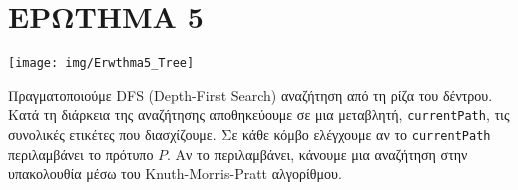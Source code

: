 \chapter{ΕΡΩΤΗΜΑ 5}
    \vspace{-10pt}
    \begin{center} \noindent
        \texttt{[image: img/Erwthma5\_Tree]}
    \end{center}

    Πραγματοποιούμε DFS (Depth-First Search) αναζήτηση από τη ρίζα του δέντρου.
    Κατά τη διάρκεια της αναζήτησης αποθηκεύουμε σε μια μεταβλητή, \texttt{currentPath}, τις συνολικές ετικέτες που διασχίζουμε.
    Σε κάθε κόμβο ελέγχουμε αν το \texttt{currentPath} περιλαμβάνει το πρότυπο \(P\).
    Αν το περιλαμβάνει, κάνουμε μια αναζήτηση στην υπακολουθία μέσω του Knuth-Morris-Pratt αλγορίθμου.

%
%
%
%
%
%
%
%
%
%
%
%
